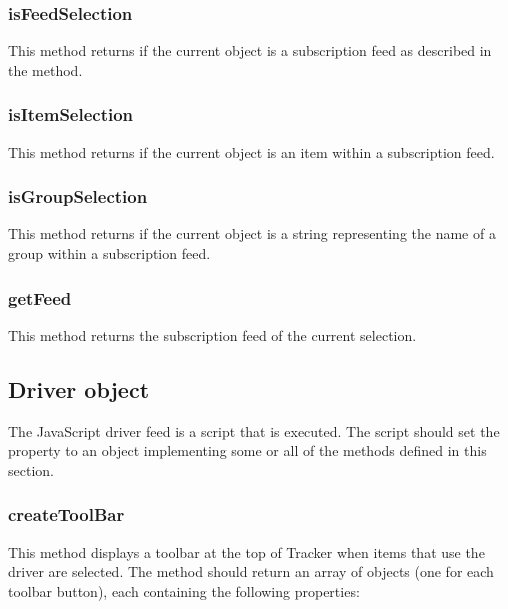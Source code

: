 \documentclass[letterpaper,12pt,english,openany,oneside]{sphinxmanual}
\begin{document}
\subsubsection{isFeedSelection}
\label{\detokenize{Tracker_InboxAPI:isfeedselection}}
This method returns  if the current  object is a subscription feed as described in the  method.




\subsubsection{isItemSelection}
\label{\detokenize{Tracker_InboxAPI:isitemselection}}
This method returns  if the current  object is an item within a subscription feed.




\subsubsection{isGroupSelection}
\label{\detokenize{Tracker_InboxAPI:isgroupselection}}
This method returns  if the current  object is a string representing the name of a group within a subscription feed.




\subsubsection{getFeed}
\label{\detokenize{Tracker_InboxAPI:getfeed}}
This method returns the subscription feed of the current selection.




\subsection{Driver object}
\label{\detokenize{Tracker_InboxAPI:driver-object}}
The JavaScript driver feed is a script that is executed. The script should set the  property to an object implementing some or all of the methods defined in this section.




\subsubsection{createToolBar}
\label{\detokenize{Tracker_InboxAPI:createtoolbar}}
This method displays a toolbar at the top of Tracker when items that use the driver are selected. The method should return an array of objects (one for each toolbar button), each containing the following properties:
\end{document}
